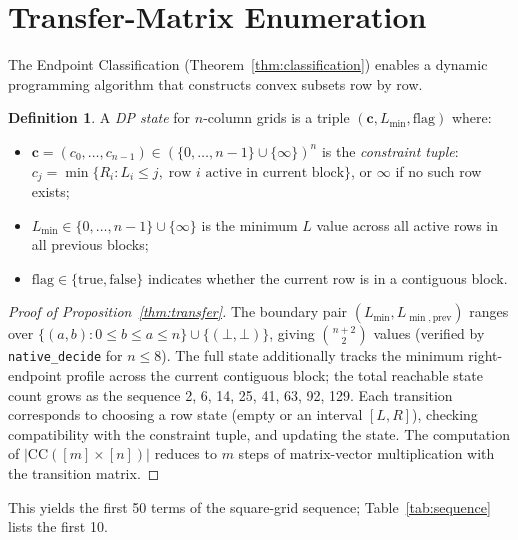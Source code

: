 \documentclass[11pt,a4paper]{article}
\theoremstyle{plain}
\theoremstyle{definition}
\newtheorem{definition}[theorem]{Definition}
\theoremstyle{remark}
\newcommand{\CC}{\mathrm{CC}}
\begin{document}
\section{Transfer-Matrix Enumeration}\label{sec:transfer}

The Endpoint Classification (Theorem~\ref{thm:classification}) enables a dynamic programming algorithm that constructs convex subsets row by row.

\begin{definition}
A \emph{DP state} for $n$-column grids is a triple $(\mathbf{c}, L_{\min}, \mathrm{flag})$ where:
\begin{itemize}[nosep]
\item $\mathbf{c} = (c_0, \ldots, c_{n-1}) \in (\{0, \ldots, n-1\} \cup \{\infty\})^n$ is the \emph{constraint tuple}: $c_j = \min\{R_i : L_i \leq j,\; \text{row } i \text{ active in current block}\}$, or $\infty$ if no such row exists;
\item $L_{\min} \in \{0, \ldots, n-1\} \cup \{\infty\}$ is the minimum $L$ value across all active rows in all previous blocks;
\item $\mathrm{flag} \in \{\mathrm{true}, \mathrm{false}\}$ indicates whether the current row is in a contiguous block.
\end{itemize}
\end{definition}

\begin{proof}[Proof of Proposition~\ref{thm:transfer}]
The boundary pair $(L_{\min}, L_{\min,\mathrm{prev}})$ ranges over $\{(a, b) : 0 \leq b \leq a \leq n\} \cup \{(\bot, \bot)\}$, giving $\binom{n+2}{2}$ values (verified by \texttt{native\_decide} for $n \leq 8$).
The full state additionally tracks the minimum right-endpoint profile across the current contiguous block; the total reachable state count grows as the sequence 2, 6, 14, 25, 41, 63, 92, 129.
Each transition corresponds to choosing a row state (empty or an interval $[L, R]$), checking compatibility with the constraint tuple, and updating the state.
The computation of $|\CC([m] \times [n])|$ reduces to $m$ steps of matrix-vector multiplication with the transition matrix.
\end{proof}

This yields the first 50 terms of the square-grid sequence; Table~\ref{tab:sequence} lists the first 10.
\end{document}
